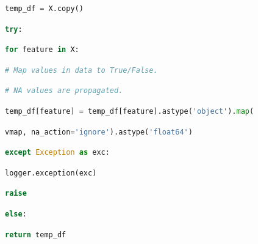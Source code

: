 \documentclass[
  11pt,
  a4paper,
  DIV=12,captions=tableheading,oneside]{scrbook}
\begin{document}
\begin{lstlisting}[language=Python,stepnumber=2,basicstyle=\footnotesize]
        temp_df = X.copy()\end{lstlisting}
\begin{lstlisting}[language=Python,stepnumber=2,basicstyle=\footnotesize]
        try:\end{lstlisting}
\begin{lstlisting}[language=Python,stepnumber=2,basicstyle=\footnotesize]
            for feature in X:\end{lstlisting}
\begin{lstlisting}[language=Python,stepnumber=2,basicstyle=\footnotesize]
                # Map values in data to True/False.\end{lstlisting}
\begin{lstlisting}[language=Python,stepnumber=2,basicstyle=\footnotesize]
                # NA values are propagated.\end{lstlisting}
\begin{lstlisting}[language=Python,stepnumber=2,basicstyle=\footnotesize]
                temp_df[feature] = temp_df[feature].astype('object').map(\end{lstlisting}
\begin{lstlisting}[language=Python,stepnumber=2,basicstyle=\footnotesize]
                    vmap, na_action='ignore').astype('float64')\end{lstlisting}
\begin{lstlisting}[language=Python,stepnumber=2,basicstyle=\footnotesize]
        except Exception as exc:\end{lstlisting}
\begin{lstlisting}[language=Python,stepnumber=2,basicstyle=\footnotesize]
            logger.exception(exc)\end{lstlisting}
\begin{lstlisting}[language=Python,stepnumber=2,basicstyle=\footnotesize]
            raise\end{lstlisting}
\begin{lstlisting}[language=Python,stepnumber=2,basicstyle=\footnotesize]
        else:\end{lstlisting}
\begin{lstlisting}[language=Python,stepnumber=2,basicstyle=\footnotesize]
            return temp_df\end{lstlisting}
\begin{lstlisting}[language=Python,stepnumber=2,basicstyle=\footnotesize]
\end{lstlisting}
\end{document}
